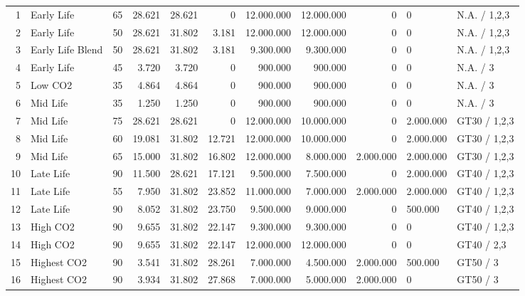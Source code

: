 \documentclass[11pt,a4paper]{article}
\numberwithin{equation}{section}
\numberwithin{table}{section}
\numberwithin{figure}{section}
\begin{document}
\begin{landscape}
\begin{longtable}{rlrrrrrrrll}
1 & Early Life & 65 & 28.621 & 28.621 & 0 & 12.000.000 & 12.000.000 & 0 & 0 & N.A. / 1,2,3\\
2 & Early Life & 50 & 28.621 & 31.802 & 3.181 & 12.000.000 & 12.000.000 & 0 & 0 & N.A. / 1,2,3\\
3 & Early Life Blend & 50 & 28.621 & 31.802 & 3.181 & 9.300.000 & 9.300.000 & 0 & 0 & N.A. / 1,2,3\\
4 & Early Life & 45 & 3.720 & 3.720 & 0 & 900.000 & 900.000 & 0 & 0 & N.A. / 3\\
5 & Low CO2 & 35 & 4.864 & 4.864 & 0 & 900.000 & 900.000 & 0 & 0 & N.A. / 3\\
6 & Mid Life & 35 & 1.250 & 1.250 & 0 & 900.000 & 900.000 & 0 & 0 & N.A. / 3\\
7 & Mid Life & 75 & 28.621 & 28.621 & 0 & 12.000.000 & 10.000.000 & 0 & 2.000.000 & GT30 / 1,2,3\\
8 & Mid Life & 60 & 19.081 & 31.802 & 12.721 & 12.000.000 & 10.000.000 & 0 & 2.000.000 & GT30 / 1,2,3\\
9 & Mid Life & 65 & 15.000 & 31.802 & 16.802 & 12.000.000 & 8.000.000 & 2.000.000 & 2.000.000 & GT30 / 1,2,3\\
10 & Late Life & 90 & 11.500 & 28.621 & 17.121 & 9.500.000 & 7.500.000 & 0 & 2.000.000 & GT40 / 1,2,3\\
11 & Late Life & 55 & 7.950 & 31.802 & 23.852 & 11.000.000 & 7.000.000 & 2.000.000 & 2.000.000 & GT40 / 1,2,3\\
12 & Late Life & 90 & 8.052 & 31.802 & 23.750 & 9.500.000 & 9.000.000 & 0 & 500.000 & GT40 / 1,2,3\\
13 & High CO2 & 90 & 9.655 & 31.802 & 22.147 & 9.300.000 & 9.300.000 & 0 & 0 & GT40 / 1,2,3\\
14 & High CO2 & 90 & 9.655 & 31.802 & 22.147 & 12.000.000 & 12.000.000 & 0 & 0 & GT40 / 2,3\\
15 & Highest CO2 & 90 & 3.541 & 31.802 & 28.261 & 7.000.000 & 4.500.000 & 2.000.000 & 500.000 & GT50 / 3\\
16 & Highest CO2 & 90 & 3.934 & 31.802 & 27.868 & 7.000.000 & 5.000.000 & 2.000.000 & 0 & GT50 / 3\\
\bottomrule\end{longtable}
\end{landscape}
\end{document}
